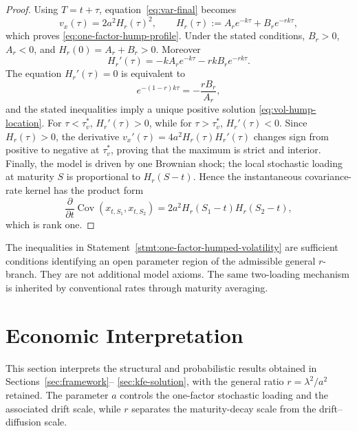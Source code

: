 \documentclass[12pt]{article}
\theoremstyle{statementstyle}
\begin{document}
\begin{proof}
Using \(T=t+\tau\), equation~\eqref{eq:var-final} becomes
\[
v_{x}(\tau)
=
2a^{2}H_{r}(\tau)^{2},
\qquad
H_{r}(\tau):=A_{r}e^{-k\tau}+B_{r}e^{-rk\tau},
\]
which proves \eqref{eq:one-factor-hump-profile}. Under the stated
conditions, \(B_{r}>0\), \(A_{r}<0\), and \(H_{r}(0)=A_{r}+B_{r}>0\).
Moreover
\[
H_{r}'(\tau)
=
-kA_{r}e^{-k\tau}-rkB_{r}e^{-rk\tau}.
\]
The equation \(H_{r}'(\tau)=0\) is equivalent to
\[
e^{-(1-r)k\tau}=-\frac{rB_{r}}{A_{r}},
\]
and the stated inequalities imply a unique positive solution
\eqref{eq:vol-hump-location}. For \(\tau<\tau_{v}^{\ast}\),
\(H_{r}'(\tau)>0\), while for \(\tau>\tau_{v}^{\ast}\),
\(H_{r}'(\tau)<0\). Since \(H_{r}(\tau)>0\), the derivative
\(v_{x}'(\tau)=4a^{2}H_{r}(\tau)H_{r}'(\tau)\) changes sign from
positive to negative at \(\tau_{v}^{\ast}\), proving that the maximum is
strict and interior. Finally, the model is driven by one Brownian shock;
the local stochastic loading at maturity \(S\) is proportional to
\(H_{r}(S-t)\). Hence the instantaneous covariance-rate kernel has the
product form
\[
\frac{\partial}{\partial t}\operatorname{Cov}(x_{t,S_{1}},x_{t,S_{2}})
=
2a^{2}H_{r}(S_{1}-t)H_{r}(S_{2}-t),
\]
which is rank one.
\end{proof}

The inequalities in Statement~\ref{stmt:one-factor-humped-volatility}
are sufficient conditions identifying an open parameter region of the
admissible general \(r\)-branch. They are not additional model axioms.
The same two-loading mechanism is inherited by conventional rates through
maturity averaging.




\section{Economic Interpretation}
\label{sec:econ}

This section interprets the structural and probabilistic results
obtained in Sections~\ref{sec:framework}--%
\ref{sec:kfe-solution}, with the general ratio
\(r=\lambda^{2}/a^{2}\) retained. The parameter \(a\) controls the
one-factor stochastic loading and the associated drift scale, while
\(r\) separates the maturity-decay scale from the drift--diffusion scale.
\end{document}
